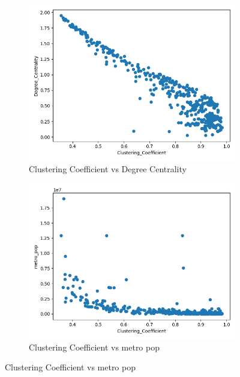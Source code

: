 \begin{figure}[H]
     \centering
     \begin{subfigure}[b]{0.3\textwidth}
         \centering
         \includegraphics[width=\textwidth]{images/comparison/ALL/relationship_Clustering_Coefficient_vs_Degree_Centrality_ALL.png}
         \caption{Clustering Coefficient vs Degree Centrality}
     \end{subfigure}
     \hfill
     \begin{subfigure}[b]{0.3\textwidth}
         \centering
         \includegraphics[width=\textwidth]{images/comparison/ALL/relationship_Clustering_Coefficient_vs_metro_pop_ALL.png}
         \centering\caption{Clustering Coefficient vs metro pop}

\end{subfigure}
\end{figure}
